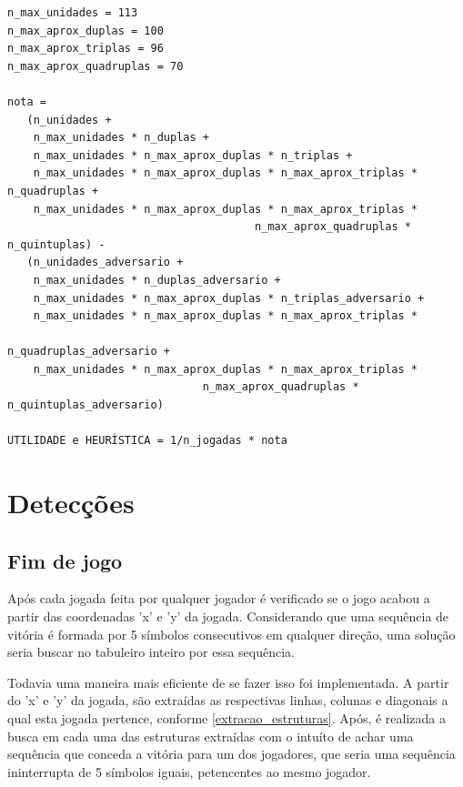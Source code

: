 \documentclass[
	article,			%
	11pt,				%
	oneside,			%
	a4paper,			%
	english,			%
	brazil,				%
	sumario=tradicional
	]{abntex2}
\begin{document}
\begin{verbatim}
n_max_unidades = 113
n_max_aprox_duplas = 100
n_max_aprox_triplas = 96
n_max_aprox_quadruplas = 70

nota = 
   (n_unidades + 
    n_max_unidades * n_duplas +
    n_max_unidades * n_max_aprox_duplas * n_triplas +
    n_max_unidades * n_max_aprox_duplas * n_max_aprox_triplas * n_quadruplas + 
    n_max_unidades * n_max_aprox_duplas * n_max_aprox_triplas * 
                                      n_max_aprox_quadruplas * n_quintuplas) -
   (n_unidades_adversario +
    n_max_unidades * n_duplas_adversario +
    n_max_unidades * n_max_aprox_duplas * n_triplas_adversario + 
    n_max_unidades * n_max_aprox_duplas * n_max_aprox_triplas * 
                                                     n_quadruplas_adversario +
    n_max_unidades * n_max_aprox_duplas * n_max_aprox_triplas *
                              n_max_aprox_quadruplas * n_quintuplas_adversario)

UTILIDADE e HEURÍSTICA = 1/n_jogadas * nota
\end{verbatim}

\section{Detecções}

\subsection{Fim de jogo}

Após cada jogada feita por qualquer jogador é verificado se o jogo acabou
a partir das coordenadas 'x' e 'y' da jogada. Considerando que uma sequência de vitória é formada
por 5 símbolos consecutivos em qualquer direção, uma solução seria buscar no tabuleiro inteiro por
essa sequência.

Todavia uma maneira mais eficiente de se fazer isso foi implementada. A partir do 'x' e 'y' da jogada, são extraídas as respectivas linhas, colunas e diagonais a qual esta jogada pertence, conforme \autoref{extracao_estruturas}. Após, é realizada a busca em cada uma das estruturas extraídas com o intuíto de achar uma sequência que conceda a vitória para um dos jogadores, que seria uma sequência ininterrupta de 5 símbolos iguais, petencentes ao mesmo jogador.
\end{document}
